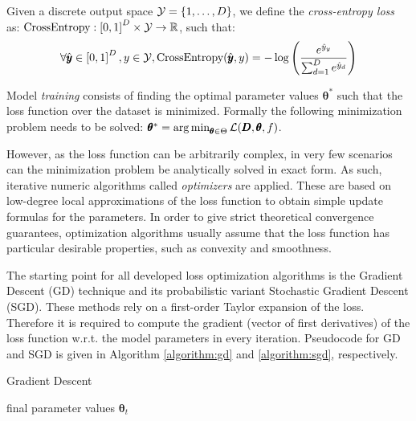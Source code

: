 \begin{definition}
Given a discrete output space $\mathcal{Y}=\mathopen{}\left\{1,\dots,D\right\}$, we define the \emph{cross-entropy loss} as: $\text{CrossEntropy}: \mathopen{}\left[0, 1\right]^D \times \mathcal{Y} \to \mathbb{R}$, such that:
\begin{equation}
\forall \hat{\pmb{y}} \in \mathopen{}\left[0, 1\right]^D, y \in \mathcal{Y}, \text{CrossEntropy}\mathopen{}\left(\hat{\pmb{y}},y\right)= - \log{\mathopen{}\left(\frac{e^{\hat{y}_y}}{\sum_{d=1}^{D}{e^{\hat{y}_d}}}\right)}\end{equation}
\end{definition}

\begin{definition}
Model \emph{training} consists of finding the optimal parameter values $\pmb{\theta}^*$ such that the loss function over the dataset is minimized. Formally the following minimization problem needs to be solved: $\pmb{\theta}^* = \operatorname*{arg\,min}_{\pmb{\theta} \in \Theta}{\mathcal{L}\mathopen{}\left(\pmb{D}, \pmb{\theta}, f\right)}$.
\end{definition}

However, as the loss function can be arbitrarily complex, in very few scenarios can the minimization problem be analytically solved in exact form. As such, iterative numeric algorithms called \emph{optimizers} are applied. These are based on low-degree local approximations of the loss function to obtain simple update formulas for the parameters. In order to give strict theoretical convergence guarantees, optimization algorithms usually assume that the loss function has particular desirable properties, such as convexity and smoothness.

The starting point for all developed loss optimization algorithms is the Gradient Descent (GD) technique and its probabilistic variant Stochastic Gradient Descent (SGD). These methods rely on a first-order Taylor expansion of the loss. Therefore it is required to compute the gradient (vector of first derivatives) of the loss function w.r.t. the model parameters in every iteration. Pseudocode for GD and SGD is given in Algorithm \ref{algorithm:gd} and \ref{algorithm:sgd}, respectively.

\begin{algorithm}
\caption{Gradient Descent}
\label{algorithm:gd}
\begin{algorithmic}
\ENDWHILE
\RETURN final parameter values $\pmb{\theta}_{t}$
\end{algorithmic}
\end{algorithm} 

